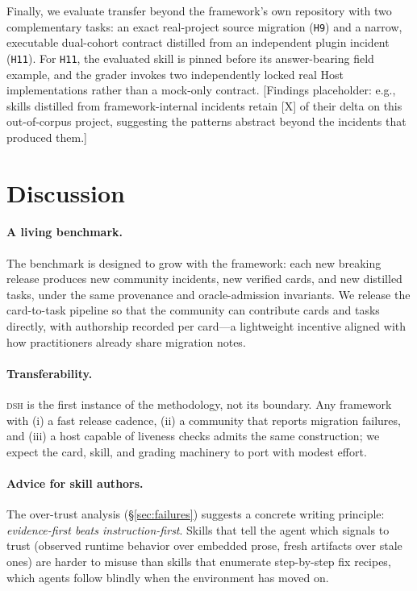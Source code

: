\documentclass[11pt]{article}
\newcommand{\framework}{\textsc{dsh}}
\begin{document}
Finally, we evaluate transfer beyond the framework's own repository with two complementary tasks: an exact real-project source migration (\texttt{H9}) and a narrow, executable dual-cohort contract distilled from an independent plugin incident (\texttt{H11}).
For \texttt{H11}, the evaluated skill is pinned before its answer-bearing field example, and the grader invokes two independently locked real Host implementations rather than a mock-only contract.
[Findings placeholder: e.g., skills distilled from framework-internal incidents retain [X] of their delta on this out-of-corpus project, suggesting the patterns abstract beyond the incidents that produced them.]

\section{Discussion}
\label{sec:discussion}

\paragraph{A living benchmark.}
The benchmark is designed to grow with the framework: each new breaking release produces new community incidents, new verified cards, and new distilled tasks, under the same provenance and oracle-admission invariants.
We release the card-to-task pipeline so that the community can contribute cards and tasks directly, with authorship recorded per card---a lightweight incentive aligned with how practitioners already share migration notes.

\paragraph{Transferability.}
\framework{} is the first instance of the methodology, not its boundary.
Any framework with (i) a fast release cadence, (ii) a community that reports migration failures, and (iii) a host capable of liveness checks admits the same construction; we expect the card, skill, and grading machinery to port with modest effort.

\paragraph{Advice for skill authors.}
The over-trust analysis (\S\ref{sec:failures}) suggests a concrete writing principle: \emph{evidence-first beats instruction-first}.
Skills that tell the agent which signals to trust (observed runtime behavior over embedded prose, fresh artifacts over stale ones) are harder to misuse than skills that enumerate step-by-step fix recipes, which agents follow blindly when the environment has moved on.
\end{document}
